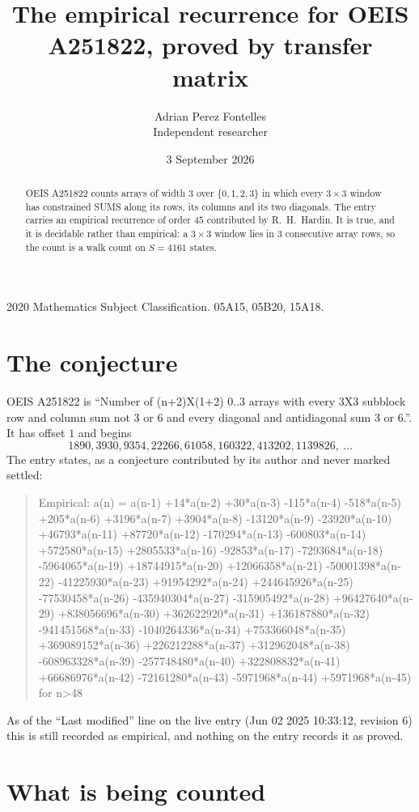 \documentclass[11pt,a4paper]{article}
\title{The empirical recurrence for OEIS A251822, proved by transfer matrix}
\author{Adrian Perez Fontelles\\ \small Independent researcher}
\date{3 September 2026}
\theoremstyle{plain}
\theoremstyle{definition}
\begin{document}
\maketitle

\begin{abstract}
OEIS A251822 counts arrays of width $3$ over $\{0,1,2,3\}$ in which every $3\times3$ window has
constrained SUMS along its rows, its columns and its two diagonals. The entry carries an
empirical recurrence of order $45$ contributed by R.~H.~Hardin. It is true, and it is
decidable rather than empirical: a $3\times3$ window lies in $3$ consecutive array rows,
so the count is a walk count on $S=4161$ states.
\end{abstract}

\noindent\small 2020 Mathematics Subject Classification. 05A15, 05B20, 15A18.\normalsize

\section{The conjecture}

OEIS A251822 is ``Number of (n+2)X(1+2) 0..3 arrays with every 3X3 subblock row and column sum not 3 or 6 and every diagonal and antidiagonal sum 3 or 6.''. It has offset $1$ and begins
\[
1890, 3930, 9354, 22266, 61058, 160322, 413202, 1139826,\ \dots
\]
The entry states, as a conjecture contributed by its author and never marked settled:
\begin{quote}
Empirical: a(n) = a(n-1) +14*a(n-2) +30*a(n-3) -115*a(n-4) -518*a(n-5) +205*a(n-6) +3196*a(n-7) +3904*a(n-8) -13120*a(n-9) -23920*a(n-10) +46793*a(n-11) +87720*a(n-12) -170294*a(n-13) -600803*a(n-14) +572580*a(n-15) +2805533*a(n-16) -92853*a(n-17) -7293684*a(n-18) -5964065*a(n-19) +18744915*a(n-20) +12066358*a(n-21) -50001398*a(n-22) -41225930*a(n-23) +91954292*a(n-24) +244645926*a(n-25) -77530458*a(n-26) -435940304*a(n-27) -315905492*a(n-28) +96427640*a(n-29) +838056696*a(n-30) +362622920*a(n-31) +136187880*a(n-32) -941451568*a(n-33) -1040264336*a(n-34) +753366048*a(n-35) +369089152*a(n-36) +226212288*a(n-37) +312962048*a(n-38) -608963328*a(n-39) -257748480*a(n-40) +322808832*a(n-41) +66686976*a(n-42) -72161280*a(n-43) -5971968*a(n-44) +5971968*a(n-45) for n>48
\end{quote}
As of the ``Last modified'' line on the live entry (Jun 02 2025 10:33:12, revision 6) this is still
recorded as empirical, and nothing on the entry records it as proved.

\section{What is being counted}
\end{document}

